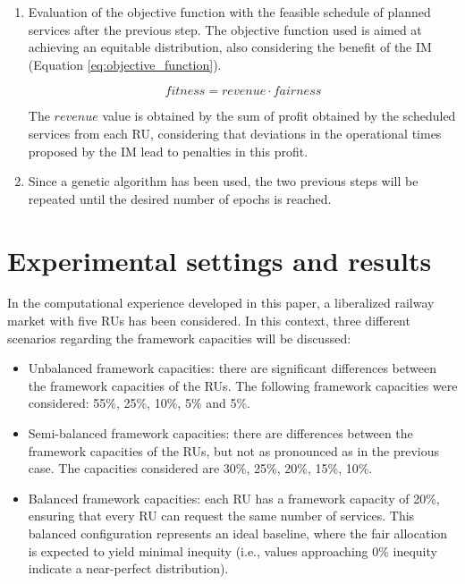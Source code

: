 \documentclass[preprint,12pt]{elsarticle}
\begin{document}
\begin{enumerate}
    \item Evaluation of the objective function with the feasible schedule of planned services after the previous step. The objective function used is aimed at achieving an equitable distribution, also considering the benefit of the IM (Equation \ref{eq:objective_function}).

    \begin{equation}
        fitness = revenue \cdot fairness
        \label{eq:objective_function}
    \end{equation}

    The $revenue$ value is obtained by the sum of profit obtained by the scheduled services from each \gls{RU}, considering that deviations in the operational times proposed by the \gls{IM} lead to penalties in this profit.
    
    \item Since a genetic algorithm has been used, the two previous steps will be repeated until the desired number of epochs is reached. 
\end{enumerate}

\section{Experimental settings and results}\label{sec:Tests}

In the computational experience developed in this paper, a liberalized railway market with five RUs has been considered. In this context, three different scenarios regarding the framework capacities will be discussed: 

\begin{itemize}
    \item Unbalanced framework capacities: there are significant differences between the framework capacities of the RUs. The following framework capacities were considered: 55\%, 25\%, 10\%, 5\% and 5\%.
    \item Semi-balanced framework capacities: there are differences between the framework capacities of the RUs, but not as pronounced as in the previous case. The capacities considered are 30\%, 25\%, 20\%, 15\%, 10\%.
    \item Balanced framework capacities: each RU has a framework capacity of 20\%, ensuring that every RU can request the same number of services. This balanced configuration represents an ideal baseline, where the fair allocation is expected to yield minimal inequity (i.e., values approaching 0\% inequity indicate a near-perfect distribution).
\end{itemize}
\end{document}
